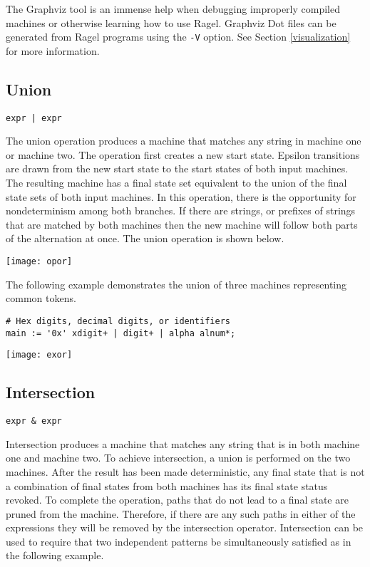\documentclass[letterpaper,11pt,oneside]{book}
\newcommand{\verbspace}{\vspace{10pt}}
\newcommand{\graphspace}{\vspace{10pt}}
\newenvironment{inline_code}{\def\baselinestretch{1}\vspace{12pt}\small}{}
\begin{document}
The Graphviz tool is an immense help when debugging improperly compiled
machines or otherwise learning how to use Ragel. Graphviz Dot files can be
generated from Ragel programs using the \verb|-V| option. See Section
\ref{visualization} for more information.


\subsection{Union}

\verb/expr | expr/

The union operation produces a machine that matches any string in machine one
or machine two. The operation first creates a new start state. Epsilon
transitions are drawn from the new start state to the start states of both
input machines.  The resulting machine has a final state set equivalent to the
union of the final state sets of both input machines. In this operation, there
is the opportunity for nondeterminism among both branches. If there are
strings, or prefixes of strings that are matched by both machines then the new
machine will follow both parts of the alternation at once. The union operation is
shown below.

\graphspace
\begin{center}
\texttt{[image: opor]}
\end{center}
\graphspace

The following example demonstrates the union of three machines representing
common tokens.

\begin{inline_code}
\begin{verbatim}
# Hex digits, decimal digits, or identifiers
main := '0x' xdigit+ | digit+ | alpha alnum*;
\end{verbatim}
\end{inline_code}
\verbspace
% }%%
% END GENERATE

\graphspace
\begin{center}
\texttt{[image: exor]}
\end{center}
\graphspace

\subsection{Intersection}

\verb|expr & expr|

Intersection produces a machine that matches any
string that is in both machine one and machine two. To achieve intersection, a
union is performed on the two machines. After the result has been made
deterministic, any final state that is not a combination of final states from
both machines has its final state status revoked. To complete the operation,
paths that do not lead to a final state are pruned from the machine. Therefore,
if there are any such paths in either of the expressions they will be removed
by the intersection operator.  Intersection can be used to require that two
independent patterns be simultaneously satisfied as in the following example.
\end{document}
